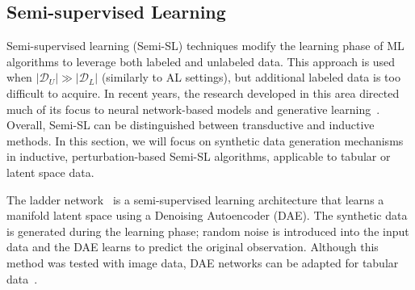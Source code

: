% 
% 
% 
% 

\subsection{Semi-supervised Learning}\label{sec:semi-supervised-learning-synth}

Semi-supervised learning (Semi-SL) techniques modify the learning phase of ML
algorithms to leverage both labeled and unlabeled data. This approach is used
when $|\mathcal{D}_U| \gg |\mathcal{D}_L|$ (similarly to AL settings), but
additional labeled data is too difficult to acquire. In recent years,
the research developed in this area directed much of its focus to neural
network-based models and generative learning~\cite{Van2020}. Overall,
Semi-SL can be distinguished between transductive and inductive methods. In
this section, we will focus on synthetic data generation mechanisms in
inductive, perturbation-based Semi-SL algorithms, applicable to tabular or
latent space data.

The ladder network~\cite{rasmus2015semi} is a semi-supervised learning
architecture that learns a manifold latent space using a Denoising
Autoencoder (DAE). The synthetic data is generated during the learning phase;
random noise is introduced into the input data and the DAE learns to predict
the original observation. Although this method was tested with image data,
DAE networks can be adapted for tabular data~\cite{sattarov2022explaining}.

